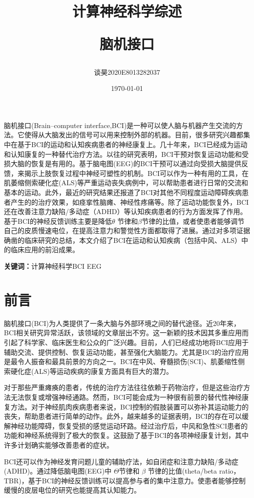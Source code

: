 \documentclass[UTF8,a4paper]{ctexart}
\title{\bfseries 计算神经科学综述 \\\begin{large}脑机接口\end{large}}
\author{谈昊\quad2020E8013282037}
\date{\today}
\begin{document}
\maketitle


\begin{center}
\parbox{130mm}{
脑机接口(Brain–computer interface,BCI)是一种可以使人脑与机器产生交流的方法。它使得从大脑发出的信号可以用来控制外部的机器。目前，很多研究兴趣都集中在基于BCI的运动和认知疾病患者的神经康复上。几十年来，BCI已经成为运动和认知康复的一种替代治疗方法。以往的研究表明，BCI干预对恢复运动功能和受损大脑的恢复是有用的。基于脑电图(EEG)的BCI干预可以通过向受损大脑提供反馈，来揭示上肢恢复过程中神经可塑性的机制。BCI可以作为一种有用的工具，在肌萎缩侧索硬化症(ALS)等严重运动丧失病例中，可以帮助患者进行日常的交流和基本的运动。此外，最近的研究结果还报道了BCI对其他不同程度运动障碍疾病患者产生的的治疗效果，如痉挛性脑瘫、神经性疼痛等。除了运动功能恢复外，BCI还在改善注意力缺陷/多动症（ADHD）等认知疾病患者的行为方面发挥了作用。基于BCI的神经反馈训练主要是降低$\theta$ 节律和$\beta$节律的比值，或者使患者能够调节自己的皮质慢速电位，在提高注意力和警觉性方面都取得了进展。通过对多项证据确凿的临床研究的总结，本文介绍了BCI在运动和认知疾病（包括中风、ALS）中的临床应用的前沿成果。
\par
\vspace{1mm}
{\bfseries 关键词：}计算神经科学\quad BCI \quad EEG}
\end{center}



\section{前言}
脑机接口(BCI)为人类提供了一条大脑与外部环境之间的替代途径。近20年来，BCI相关研究异常活跃，该领域的文章层出不穷。这一新颖的技术因其多重应用而引起了科学家、临床医生和公众的广泛兴趣。目前，人们已经成功地将BCI应用于辅助交流、提供控制、恢复运动功能，甚至强化大脑能力。尤其是BCI的治疗应用是最令人振奋和最具前景的方向之一。BCI在中风、脊髓损伤(SCI)、肌萎缩性侧索硬化症(ALS)等运动疾病的康复方面具有巨大的潜力。
\par
对于那些严重瘫痪的患者，传统的治疗方法往往依赖于药物治疗，但是这些治疗方法无法恢复或增强神经通路。然而，BCI可能会成为一种很有前景的替代性神经康复方法。对于神经肌肉疾病患者来说，BCI控制的假肢装置可以弥补其运动能力的丧失，帮助患者进行简单的动作。此外，越来越多的证据表明，BCI的存在可以缓解神经功能障碍，恢复受损的感觉运动环路。经过治疗后，中风和急性SCI患者的功能和神经系统得到了极大的恢复。这鼓励了基于BCI的各项神经康复计划，其中许多计划确实能够改善患者的症状。
\par
BCI还可以作为神经发育问题儿童的辅助疗法，如自闭症和注意力缺陷/多动症(ADHD)。通过降低脑电图(EEG)中 $\Theta$节律和 $\beta$ 节律的比值(theta/beta ratio，TBR)，基于BCI的神经反馈训练可以提高参与者的集中注意力。使患者能够控制缓慢的皮层电位的研究也能提高其认知能力。
\end{document}
